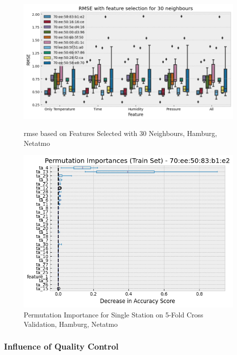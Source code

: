 \begin{figure}[htp]
    \centering
    \includegraphics[width=1\textwidth]{images/rmse_30_neighbours_feature_importance_by_pid.png}
    \caption{\gls{rmse} based on Features Selected with 30 Neighbours, Hamburg, Netatmo}
    \label{fig:eval feature importance 10 stations single location}

    \centering
    \includegraphics[width=1\textwidth]{images/rmse_30_neighbours_permutation_importance_by_pid.png}
    \caption{Permutation Importance for Single Station on 5-Fold Cross Validation, Hamburg, Netatmo}
    \label{fig:eval permutation importance single station}
\end{figure}

\subsubsection{Influence of Quality Control}

